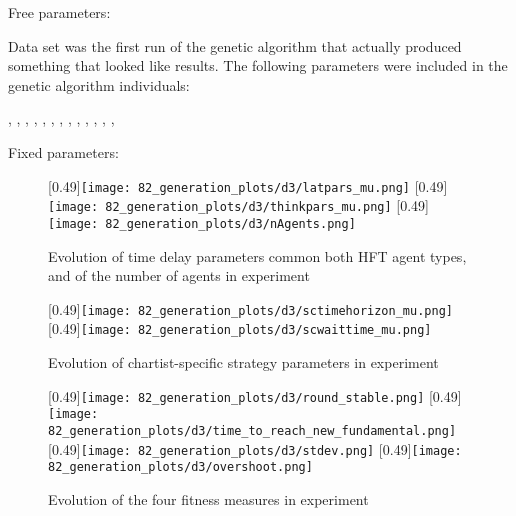Free parameters:

Data set \dthree was the first run of the genetic algorithm that actually produced something that looked like results. The following parameters were included in the genetic algorithm individuals:
\begin{center}
\sclatencymu, \sclatencys, \scnAgents, \scthinkmu, \scthinks, \sctimehorizonmu, \sctimehorizons, \scwaitTimeBetweenTradingmu, \scwaitTimeBetweenTradings, \ssmmlatencymu, \ssmmlatencys, \ssmmnAgents, \ssmmthinkmu, \ssmmthinks
\end{center}

Fixed parameters:




\begin{figure}
	\centering
	[0.49\linewidth]{\texttt{[image: 82\_generation\_plots/d3/latpars\_mu.png]}}
	[0.49\linewidth]{\texttt{[image: 82\_generation\_plots/d3/thinkpars\_mu.png]}}
	[0.49\linewidth]{\texttt{[image: 82\_generation\_plots/d3/nAgents.png]}}	\caption{Evolution of time delay parameters common both HFT agent types, and of the number of agents in experiment \dthree}\label{fig:d3_evolution_latpars_nAgents}
\end{figure}


\begin{figure}
	[0.49\linewidth]{\texttt{[image: 82\_generation\_plots/d3/sctimehorizon\_mu.png]}}
	[0.49\linewidth]{\texttt{[image: 82\_generation\_plots/d3/scwaittime\_mu.png]}}
	\caption{Evolution of chartist-specific strategy parameters in experiment \dthree}\label{fig:d3_evolution_thinkpars}
\end{figure}

\begin{figure}
	\centering
	[0.49\linewidth]{\texttt{[image: 82\_generation\_plots/d3/round\_stable.png]}}
	[0.49\linewidth]{\texttt{[image: 82\_generation\_plots/d3/time\_to\_reach\_new\_fundamental.png]}}
	[0.49\linewidth]{\texttt{[image: 82\_generation\_plots/d3/stdev.png]}}
	[0.49\linewidth]{\texttt{[image: 82\_generation\_plots/d3/overshoot.png]}}
	\caption{Evolution of the four fitness measures in experiment \dthree}\label{fig:d3_evolution_fitness}
\end{figure}


